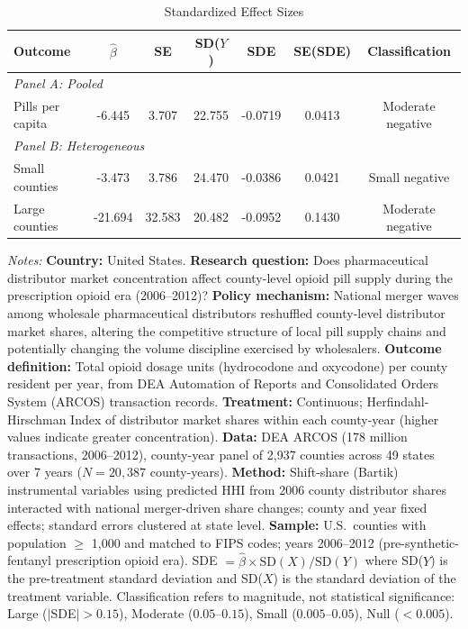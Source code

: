 \begin{table}[htbp]
\centering
\caption{Standardized Effect Sizes}
\label{tab:sde}
\begin{threeparttable}
\begin{tabular}{lcccccc}
\hline\hline
Outcome & $\hat{\beta}$ & SE & SD($Y$) & SDE & SE(SDE) & Classification \\
\hline
\multicolumn{7}{l}{\textit{Panel A: Pooled}} \\
Pills per capita & -6.445 & 3.707 & 22.755 & -0.0719 & 0.0413 & Moderate negative \\
\hline
\multicolumn{7}{l}{\textit{Panel B: Heterogeneous}} \\
\quad Small counties & -3.473 & 3.786 & 24.470 & -0.0386 & 0.0421 & Small negative \\
\quad Large counties & -21.694 & 32.583 & 20.482 & -0.0952 & 0.1430 & Moderate negative \\
\hline\hline
\end{tabular}
\begin{tablenotes}[flushleft]
\small
\item \textit{Notes:} \textbf{Country:} United States. \textbf{Research question:} Does pharmaceutical distributor market concentration affect county-level opioid pill supply during the prescription opioid era (2006--2012)? \textbf{Policy mechanism:} National merger waves among wholesale pharmaceutical distributors reshuffled county-level distributor market shares, altering the competitive structure of local pill supply chains and potentially changing the volume discipline exercised by wholesalers. \textbf{Outcome definition:} Total opioid dosage units (hydrocodone and oxycodone) per county resident per year, from DEA Automation of Reports and Consolidated Orders System (ARCOS) transaction records. \textbf{Treatment:} Continuous; Herfindahl-Hirschman Index of distributor market shares within each county-year (higher values indicate greater concentration). \textbf{Data:} DEA ARCOS (178 million transactions, 2006--2012), county-year panel of 2,937 counties across 49 states over 7 years ($N = 20{,}387$ county-years). \textbf{Method:} Shift-share (Bartik) instrumental variables using predicted HHI from 2006 county distributor shares interacted with national merger-driven share changes; county and year fixed effects; standard errors clustered at state level. \textbf{Sample:} U.S.\ counties with population $\geq$ 1,000 and matched to FIPS codes; years 2006--2012 (pre-synthetic-fentanyl prescription opioid era). SDE $= \hat{\beta} \times \text{SD}(X) / \text{SD}(Y)$ where SD($Y$) is the pre-treatment standard deviation and SD($X$) is the standard deviation of the treatment variable. Classification refers to magnitude, not statistical significance: Large ($|$SDE$| > 0.15$), Moderate ($0.05$--$0.15$), Small ($0.005$--$0.05$), Null ($< 0.005$).
\end{tablenotes}
\end{threeparttable}
\end{table}

